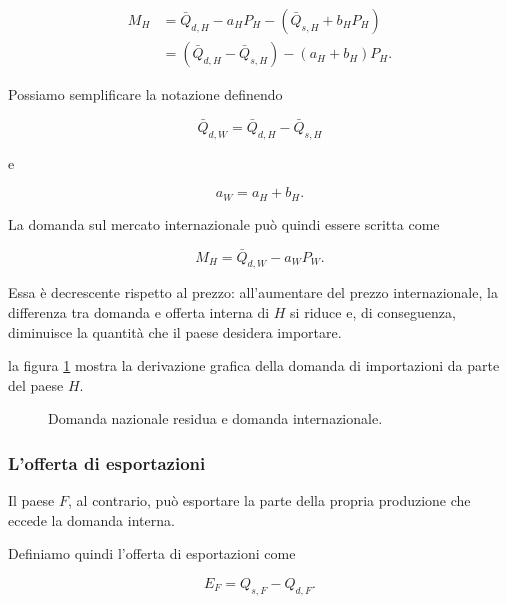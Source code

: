 \begin{align}
    M_H
    &=
    \bar{Q}_{d,H}-a_HP_H
    -
    \left(\bar{Q}_{s,H}+b_HP_H\right)
    \\
    &=
    \left(\bar{Q}_{d,H}-\bar{Q}_{s,H}\right)
    -
    \left(a_H+b_H\right)P_H.
\end{align}

Possiamo semplificare la notazione definendo

\begin{equation*}
    \bar{Q}_{d,W}
    =
    \bar{Q}_{d,H}-\bar{Q}_{s,H}
\end{equation*}

e

\begin{equation*}
    a_W=a_H+b_H.
\end{equation*}

La domanda sul mercato internazionale può quindi essere scritta
come

\begin{equation*}
    M_H=\bar{Q}_{d,W}-a_WP_W.
    \label{eq:domanda-mondiale}
\end{equation*}

Essa è decrescente rispetto al prezzo: all'aumentare del prezzo
internazionale, la differenza tra domanda e offerta interna di $H$
si riduce e, di conseguenza, diminuisce la quantità che il paese
desidera importare.

la figura \ref{fig:domanda_internazionale} mostra la derivazione grafica della domanda di importazioni da parte del paese $H$.

\begin{figure}[ht]
\centering

\resizebox{\linewidth}{!}{%

}
\caption{Domanda nazionale residua e domanda internazionale.}
\label{fig:domanda_internazionale}
\end{figure}


\subsubsection{L'offerta di esportazioni}

Il paese $F$, al contrario, può esportare la parte della propria
produzione che eccede la domanda interna.

Definiamo quindi l'offerta di esportazioni come

\begin{equation*}
    E_F=Q_{s,F}-Q_{d,F}.
\end{equation*}

